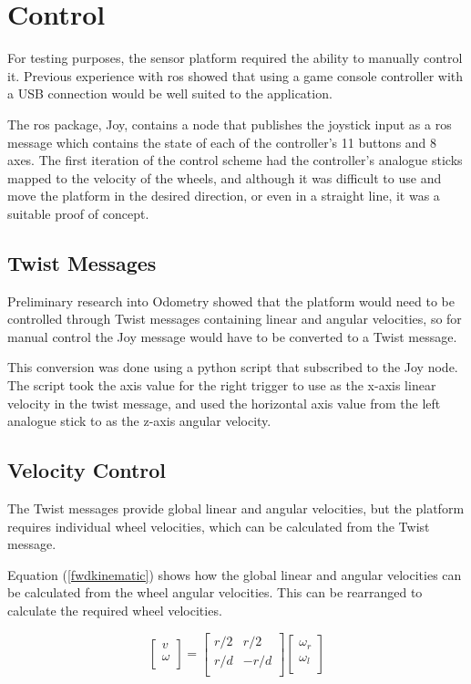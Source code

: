 \chapter{Control}

For testing purposes, the sensor platform required the ability to manually control it. Previous experience with \gls{ros} showed that using a game console controller with a USB connection would be well suited to the application.

The \gls{ros} package, Joy, contains a node that publishes the joystick input as a \gls{ros} message which contains the state of each of the controller's 11 buttons and 8 axes. The first iteration of the control scheme had the controller's analogue sticks mapped to the velocity of the wheels, and although it was difficult to use and move the platform in the desired direction, or even in a straight line, it was a suitable proof of concept.

\section{Twist Messages}

Preliminary research into Odometry showed that the platform would need to be controlled through Twist messages containing linear and angular velocities, so for manual control the Joy message would have to be converted to a Twist message.

This conversion was done using a python script that subscribed to the Joy node. The script took the axis value for the right trigger to use as the x-axis linear velocity in the twist message, and used the horizontal axis value from the left analogue stick to as the z-axis angular velocity.

\section{Velocity Control}

The Twist messages provide global linear and angular velocities, but the platform requires individual wheel velocities, which can be calculated from the Twist message. 

Equation (\ref{fwdkinematic}) shows how the global linear and angular velocities can be calculated from the wheel angular velocities. This can be rearranged to calculate the required wheel velocities.


\begin{equation}\label{fwdkinematic}
   \left[ {\begin{array}{cc}
   v \\
   \omega \\
  \end{array} } \right] =
  \left[ {\begin{array}{cc}
   r/2 & r/2 \\
   r/d & -r/d \\
  \end{array} } \right]
  \left[ {\begin{array}{cc}
   \omega_r\\
   \omega_l\\
  \end{array} } \right]   
\end{equation}

